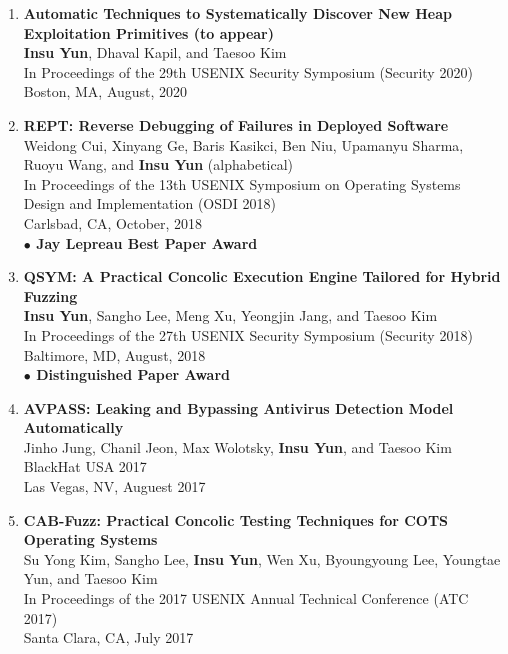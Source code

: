 \documentclass[11pt,letterpaper]{article}
\begin{document}
\begin{enumerate}
  \item \textbf{Automatic Techniques to Systematically Discover New Heap Exploitation Primitives (to appear)} \\
  {\footnotesize
    \textbf{Insu Yun}, Dhaval Kapil, and Taesoo Kim \\
    In Proceedings of the 29th USENIX Security Symposium (Security 2020) \\
    Boston, MA, August, 2020
  }
  \item \textbf{REPT: Reverse Debugging of Failures in Deployed Software} \\
  {\footnotesize
    Weidong Cui, Xinyang Ge, Baris Kasikci, Ben Niu, Upamanyu Sharma, Ruoyu Wang, and \textbf{Insu Yun} (alphabetical) \\
    In Proceedings of the 13th USENIX Symposium on Operating Systems Design and Implementation (OSDI 2018) \\
    Carlsbad, CA, October, 2018 \\
    \textbf{$\bullet$ Jay Lepreau Best Paper Award}
  }
  \item \textbf{QSYM: A Practical Concolic Execution Engine Tailored for Hybrid Fuzzing} \\
  {\footnotesize
    \textbf{Insu Yun}, Sangho Lee, Meng Xu, Yeongjin Jang, and Taesoo Kim \\
    In Proceedings of the 27th USENIX Security Symposium (Security 2018) \\
    Baltimore, MD, August, 2018 \\
    \textbf{$\bullet$ Distinguished Paper Award}
  }
  \item \textbf{AVPASS: Leaking and Bypassing Antivirus Detection Model Automatically} \\
  {\footnotesize
    Jinho Jung, Chanil Jeon, Max Wolotsky, \textbf{Insu Yun}, and Taesoo Kim \\
    BlackHat USA 2017 \\
    Las Vegas, NV, Auguest 2017
  }
  \item \textbf{CAB-Fuzz: Practical Concolic Testing Techniques for COTS Operating Systems} \\
  {\footnotesize
    Su Yong Kim, Sangho Lee, \textbf{Insu Yun}, Wen Xu, Byoungyoung Lee, Youngtae Yun, and Taesoo Kim \\
    In Proceedings of the 2017 USENIX Annual Technical Conference (ATC 2017) \\
    Santa Clara, CA, July 2017 
}
\end{enumerate}
\end{document}
